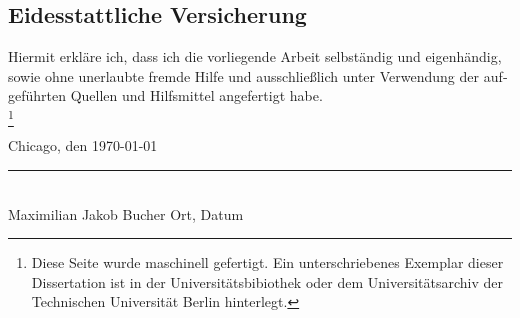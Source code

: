 %
\newcommand\blfootnote[1]{%
	\begingroup
	\renewcommand\thefootnote{}\footnote{#1}
	\addtocounter{footnote}{-1}
	\endgroup
	}
%
%
%
\begin{otherlanguage}{german}
%
\chapter{Eidesstattliche Versicherung}
Hiermit erkläre ich, dass ich die vorliegende Arbeit selbständig und eigenhändig, sowie ohne unerlaubte fremde Hilfe und ausschließlich unter Verwendung der aufgeführten Quellen und Hilfsmittel angefertigt habe.\\

\blfootnote{Diese Seite wurde maschinell gefertigt. Ein unterschriebenes Exemplar dieser Dissertation ist in der Universitätsbibiothek oder dem Universitätsarchiv der Technischen Universität Berlin hinterlegt.}
%
\hspace{8cm}Chicago, den \today\\
\hspace{2.5cm}\rule{15cm}{0.4pt}\\
\hspace{2.5cm}Maximilian Jakob Bucher
\hspace{8cm}Ort, Datum\\
%
\end{otherlanguage}